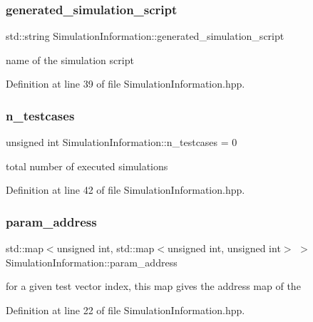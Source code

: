 \subsubsection{\texorpdfstring{generated\+\_\+simulation\+\_\+script}{generated\_simulation\_script}}
{\footnotesize\ttfamily std\+::string Simulation\+Information\+::generated\+\_\+simulation\+\_\+script}



name of the simulation script 



Definition at line 39 of file Simulation\+Information.\+hpp.

\mbox{\label{classSimulationInformation_ad0811b9b2333103a7bb8042a9094e9bb}} 
\subsubsection{\texorpdfstring{n\+\_\+testcases}{n\_testcases}}
{\footnotesize\ttfamily unsigned int Simulation\+Information\+::n\+\_\+testcases = 0}



total number of executed simulations 



Definition at line 42 of file Simulation\+Information.\+hpp.

\mbox{\label{classSimulationInformation_a1750c1ab42e7f5e9f86e322cd76faedc}} 
\subsubsection{\texorpdfstring{param\+\_\+address}{param\_address}}
{\footnotesize\ttfamily std\+::map$<$unsigned int, std\+::map$<$unsigned int, unsigned int$>$ $>$ Simulation\+Information\+::param\+\_\+address}



for a given test vector index, this map gives the address map of the 



Definition at line 22 of file Simulation\+Information.\+hpp.

